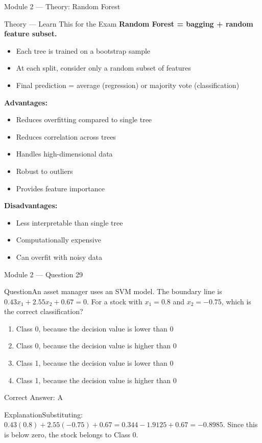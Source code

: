 \documentclass[aspectratio=169,10pt]{beamer}
\newcommand{\question}[1]{\begin{block}{Question}#1\end{block}}
\newcommand{\options}[4]{%
	\begin{enumerate}[label=\Alph*.,leftmargin=*]
		\item #1
		\item #2
		\item #3
		\item #4
	\end{enumerate}
}
\newcommand{\answerbox}[1]{\begin{exampleblock}{Correct Answer: #1}\end{exampleblock}}
\newcommand{\explain}[1]{\begin{block}{Explanation}#1\end{block}}
\newcommand{\theory}[1]{%
	\begin{block}{Theory --- Learn This for the Exam}
		\small #1
	\end{block}
}
\begin{document}
	\begin{frame}{Module 2 --- Theory: Random Forest}
		\theory{
			\textbf{Random Forest = bagging + random feature subset.}
			\begin{itemize}
				\item Each tree is trained on a bootstrap sample
				\item At each split, consider only a random subset of features
				\item Final prediction = average (regression) or majority vote (classification)
			\end{itemize}
			\textbf{Advantages:}
			\begin{itemize}
				\item Reduces overfitting compared to single tree
				\item Reduces correlation across trees
				\item Handles high-dimensional data
				\item Robust to outliers
				\item Provides feature importance
			\end{itemize}
			\textbf{Disadvantages:}
			\begin{itemize}
				\item Less interpretable than single tree
				\item Computationally expensive
				\item Can overfit with noisy data
			\end{itemize}
		}
	\end{frame}
	
	\begin{frame}{Module 2 --- Question 29}
		\question{An asset manager uses an SVM model. The boundary line is $0.43x_1 + 2.55x_2 + 0.67 = 0$. For a stock with $x_1 = 0.8$ and $x_2 = -0.75$, which is the correct classification?}
		\options{Class 0, because the decision value is lower than 0}{Class 0, because the decision value is higher than 0}{Class 1, because the decision value is lower than 0}{Class 1, because the decision value is higher than 0}
		\answerbox{A}
		\explain{Substituting: $0.43(0.8) + 2.55(-0.75) + 0.67 = 0.344 - 1.9125 + 0.67 = -0.8985$. Since this is below zero, the stock belongs to Class 0.}
	\end{frame}
	
\end{document}
